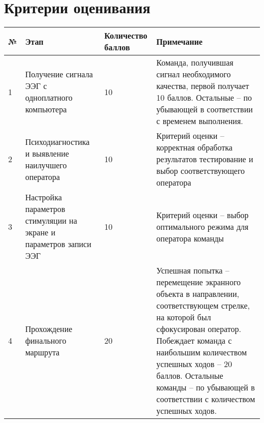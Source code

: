 \section{Критерии оценивания}

\begin{table}[H]
    \begin{center}
        \begin{tabular}{|p{1.5cm}|p{3.5cm}|p{2.5cm}|p{5.5cm}|}
            \hline
            № & Этап & Количество баллов & Примечание \\
            \hline
            1 & Получение сигнала ЭЭГ с одноплатного компьютера & 10 & Команда, получившая сигнал необходимого качества, первой получает 10 баллов. Остальные – по убывающей в соответствии с временем выполнения. \\
            \hline
            2 & Психодиагностика и выявление наилучшего оператора & 10 & Критерий оценки – корректная обработка результатов тестирование и выбор соответствующего оператора \\
            \hline
            3 & Настройка параметров стимуляции на экране и параметров записи ЭЭГ & 10 & Критерий оценки – выбор оптимального режима для оператора команды \\
            \hline
            4 & Прохождение финального маршрута & 20 & Успешная попытка – перемещение экранного объекта в направлении, соответствующем стрелке, на которой был сфокусирован оператор. Побеждает команда с наибольшим количеством успешных ходов – 20 баллов. Остальные команды – по убывающей в соответствии с количеством успешных ходов. \\
            \hline
        \end{tabular}
    \end{center}
\end{table}